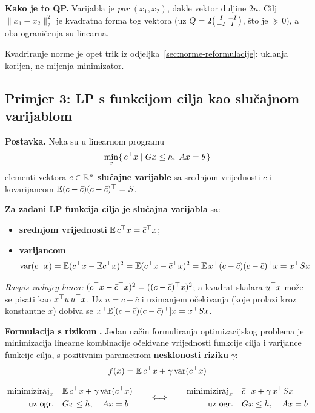 \textbf{Kako je to QP.} Varijabla je \emph{par} $(x_1, x_2)$, dakle vektor
duljine $2n$. Cilj $\|x_1-x_2\|_2^2$ je kvadratna forma tog vektora (uz
$Q = 2\begin{psmallmatrix} I & -I \\ -I & I\end{psmallmatrix}$, što je
$\succeq 0$), a oba ograničenja su linearna. \checkmark

Kvadriranje norme je opet trik iz odjeljka~\ref{sec:norme-reformulacije}: uklanja korijen, ne mijenja
minimizator.

\subsection{Primjer 3: LP s funkcijom cilja kao slučajnom varijablom}

\textbf{Postavka.} Neka su u linearnom programu
\[
\min_x\{\, c^{\top} x \mid Gx \le h,\; Ax = b \,\}
\]
elementi vektora $c \in \mathbb{R}^n$ \textbf{slučajne varijable} sa srednjom
vrijednosti $\bar c$ i kovarijancom
$\mathbb{E}(c-\bar c)(c-\bar c)^{\top} = S$.

\textbf{Za zadani LP funkcija cilja je slučajna varijabla} sa:

\begin{itemize}
  \item \textbf{srednjom vrijednosti} $\mathbb{E}\,c^{\top} x = \bar c^{\top} x$;
  \item \textbf{varijancom}
        \[
        \operatorname{var}(c^{\top} x)
        = \mathbb{E}(c^{\top} x - \mathbb{E}c^{\top} x)^2
        = \mathbb{E}(c^{\top} x - \bar c^{\top} x)^2
        = \mathbb{E}\,x^{\top}(c-\bar c)(c-\bar c)^{\top} x
        = x^{\top} Sx
        \]
\end{itemize}

\emph{Raspis zadnjeg lanca:} $(c^{\top} x - \bar c^{\top} x)^2 = ((c-\bar c)^{\top} x)^2$; a
kvadrat skalara $u^{\top} x$ može se pisati kao $x^{\top} u\,u^{\top} x$. Uz $u = c - \bar c$
i uzimanjem očekivanja (koje prolazi kroz konstantne $x$) dobiva se
$x^{\top}\mathbb{E}[(c-\bar c)(c-\bar c)^{\top}]x = x^{\top} Sx$. \checkmark

\textbf{Formulacija s rizikom} \textbf{.} Jedan način formuliranja
optimizacijskog problema je minimizacija linearne kombinacije očekivane
vrijednosti funkcije cilja i varijance funkcije cilja, s pozitivnim
parametrom \textbf{nesklonosti riziku} $\gamma$:
\[
f(x) = \mathbb{E}\,c^{\top} x + \gamma\operatorname{var}(c^{\top} x)
\]

\[
\begin{aligned}
\text{minimiziraj}_x \quad & \mathbb{E}\,c^{\top} x + \gamma\operatorname{var}(c^{\top} x) \\
\text{uz ogr.} \quad & Gx \le h, \quad Ax = b
\end{aligned}
\qquad\Longleftrightarrow\qquad
\begin{aligned}
\text{minimiziraj}_x \quad & \bar c^{\top} x + \gamma\, x^{\top} Sx \\
\text{uz ogr.} \quad & Gx \le h, \quad Ax = b
\end{aligned}
\]

